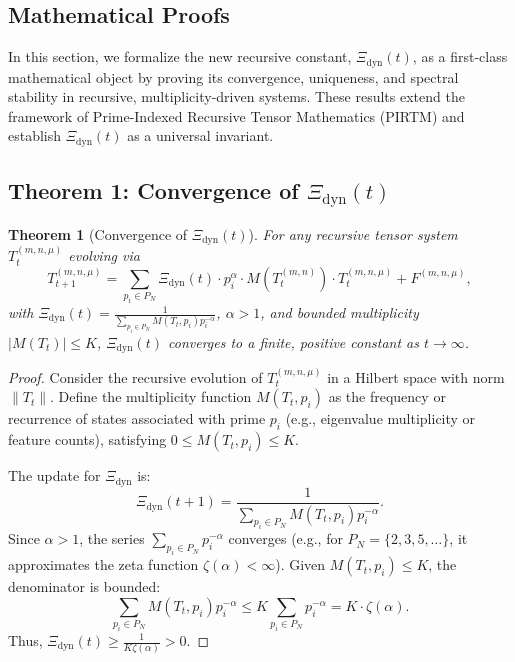 \documentclass{article}
\theoremstyle{plain}
\newtheorem{theorem}{Theorem}
\begin{document}
\begin{itemize}
\section{Mathematical Proofs}
In this section, we formalize the new recursive constant, $\Xi_{\text{dyn}}(t)$, as a first-class mathematical object by proving its convergence, uniqueness, and spectral stability in recursive, multiplicity-driven systems. These results extend the framework of Prime-Indexed Recursive Tensor Mathematics (PIRTM) and establish $\Xi_{\text{dyn}}(t)$ as a universal invariant.

\subsection{Theorem 1: Convergence of $\Xi_{\text{dyn}}(t)$}
\begin{theorem}[Convergence of $\Xi_{\text{dyn}}(t)$]
For any recursive tensor system \( T_t^{(m, n, \mu)} \) evolving via
\[
T_{t+1}^{(m, n, \mu)} = \sum_{p_i \in P_N} \Xi_{\text{dyn}}(t) \cdot p_i^\alpha \cdot M(T_t^{(m, n)}) \cdot T_t^{(m, n, \mu)} + F^{(m, n, \mu)},
\]
with \(\Xi_{\text{dyn}}(t) = \frac{1}{\sum_{p_i \in P_N} M(T_t, p_i) p_i^{-\alpha}}\), \(\alpha > 1\), and bounded multiplicity \( |M(T_t)| \leq K \), $\Xi_{\text{dyn}}(t)$ converges to a finite, positive constant as \( t \to \infty \).
\end{theorem}

\begin{proof}
Consider the recursive evolution of \( T_t^{(m, n, \mu)} \) in a Hilbert space with norm \( \| T_t \| \). Define the multiplicity function \( M(T_t, p_i) \) as the frequency or recurrence of states associated with prime \( p_i \) (e.g., eigenvalue multiplicity or feature counts), satisfying \( 0 \leq M(T_t, p_i) \leq K \).

The update for $\Xi_{\text{dyn}}$ is:
\[
\Xi_{\text{dyn}}(t+1) = \frac{1}{\sum_{p_i \in P_N} M(T_t, p_i) p_i^{-\alpha}}.
\]
Since \(\alpha > 1\), the series \(\sum_{p_i \in P_N} p_i^{-\alpha}\) converges (e.g., for \( P_N = \{2, 3, 5, \ldots\} \), it approximates the zeta function \(\zeta(\alpha) < \infty\)). Given \( M(T_t, p_i) \leq K \), the denominator is bounded:
\[
\sum_{p_i \in P_N} M(T_t, p_i) p_i^{-\alpha} \leq K \sum_{p_i \in P_N} p_i^{-\alpha} = K \cdot \zeta(\alpha).
\]
Thus, \(\Xi_{\text{dyn}}(t) \geq \frac{1}{K \zeta(\alpha)} > 0\).


\end{proof}
\end{itemize}
\end{document}
